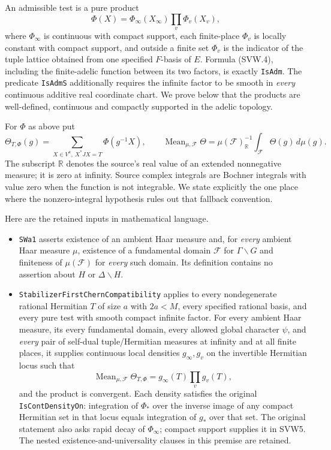 \documentclass[11pt,a4paper]{article}
\numberwithin{equation}{section}
\theoremstyle{remark}\newtheorem{remark}[theorem]{Remark}
\begin{document}
An admissible test is a pure product
\[
 \Phi(X)=\Phi_\infty(X_\infty)\prod_v\Phi_v(X_v),
 \tag{SVW.4}
\]
where $\Phi_\infty$ is continuous with compact support, each finite-place
$\Phi_v$ is locally constant with compact support, and outside a finite
set $\Phi_v$ is the indicator of the tuple lattice obtained from one
specified $F$-basis of $E$.  Formula (SVW.4), including the finite-adelic
function between its two factors, is exactly \texttt{Is\allowbreak Adm}.  The
predicate \texttt{Is\allowbreak Adm\allowbreak S} additionally requires the infinite factor to
be smooth in \emph{every} continuous additive real coordinate chart.
We prove below that the products are well-defined, continuous and
compactly supported in the adelic topology.

For $\Phi$ as above put
\[
 \Theta_{T,\Phi}(g)=
  \sum_{X\in V^a,\ X^*JX=T}\Phi(g^{-1}X),\qquad
 \operatorname{Mean}_{\mu,\mathcal F}\Theta
   =\mu(\mathcal F)_{\mathbb R}^{-1}
                      \int_{\mathcal F}\Theta(g)\,d\mu(g).
 \tag{SVW.5}
\]
The subscript $\mathbb R$ denotes the source's real value of an
extended nonnegative measure; it is zero at infinity.  Source complex
integrals are Bochner integrals with value zero when the function is
not integrable.  We state explicitly the one place where the
nonzero-integral hypothesis rules out that fallback convention.

Here are the retained inputs in mathematical language.

\begin{itemize}
\item \texttt{SWa1} asserts existence of an ambient Haar measure and,
for \emph{every} ambient Haar measure $\mu$, existence of a fundamental
domain $\mathcal F$ for $\Gamma\backslash G$ and finiteness of
$\mu(\mathcal F)$ for \emph{every} such domain.  Its definition
contains no assertion about $H$ or $\Delta\backslash H$.
\item \texttt{Stabilizer\allowbreak First\allowbreak Chern}\allowbreak\texttt{Compatibility} applies to every
nondegenerate rational Hermitian $T$ of size $a$ with $2a<M$,
every specified rational basis, and every pure test with smooth compact
infinite factor.  For every ambient Haar measure, its every
fundamental domain, every allowed global character $\psi$, and
\emph{every} pair of self-dual tuple/Hermitian measures at infinity
and at all finite places, it supplies continuous local densities
$g_\infty,g_v$ on the invertible Hermitian locus such that
\[
 \operatorname{Mean}_{\mu,\mathcal F}\Theta_{T,\Phi}
       =g_\infty(T)\prod_v g_v(T),
 \tag{SVW.6}
\]
and the product is convergent.  Each density satisfies the original
\texttt{Is\allowbreak Cont\allowbreak Density\allowbreak On}: integration of $\Phi_*$ over the inverse
image of any compact Hermitian set in that locus equals integration
of $g_*$ over that set.  The original statement also asks rapid decay
of $\Phi_\infty$; compact support supplies it in SVW5.  The nested
existence-and-universality clauses in this premise are retained.
\end{itemize}
\end{document}
